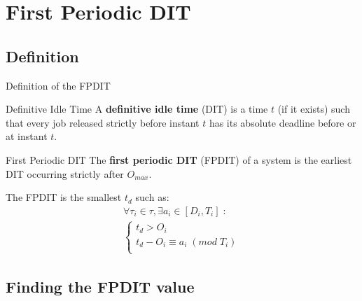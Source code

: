 \documentclass{beamer}
\begin{document}
\section{First Periodic DIT}

    \begin{frame}
    \end{frame}

	\subsection{Definition}

	\begin{frame}{Definition of the FPDIT}
        \begin{block}{Definitive Idle Time}
            A \textbf{definitive idle time} (DIT) \cite{lipariaverage} is a time $t$ (if it exists) such that every job released strictly before instant $t$ has its absolute deadline before or at instant $t$.
        \end{block}

        \begin{block}{First Periodic DIT}
			The \textbf{first periodic DIT} (FPDIT) of a system is the earliest DIT occurring
			strictly after $O_{max}$.
		\end{block}

        The FPDIT is the smallest $t_d$ such as:
       \[
            \begin{array}{l}
                \forall \tau_i \in \tau, \exists a_i \in [D_i,T_i] \; :\\
                \left\{
                    \begin{array}{l}
                        t_d > O_i \\
                        t_d - O_i \equiv a_i \; (mod \; T_i)
                        \\
                    \end{array}
                \right.
            \end{array}
        \]

	\end{frame}

	\subsection{Finding the FPDIT value}
\end{document}
